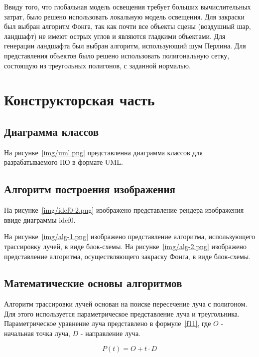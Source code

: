 Ввиду того, что глобальная модель освещения требует больших вычислительных затрат, было решено использовать локальную модель освещения. Для закраски был выбран алгоритм Фонга, так как почти все объекты сцены (воздушный шар, ландшафт) не имеют острых углов и являются гладкими объектами. Для генерации ландшафта был выбран алгоритм, использующий шум Перлина. Для представления объектов было решено использовать полигональную сетку, состоящую из треугольных полигонов, с заданной нормалью.

\chapter{Конструкторская часть}
\section{Диаграмма классов}
На рисунке~\ref{img/uml.png} представленна диаграмма классов для разрабатываемого ПО в формате UML.

\section{Алгоритм построения изображения}
На рисунке~\ref{img/idef0-2.png} изображено представление рендера изображения ввиде диаграммы idef0.

На рисунке~\ref{img/alg-1.png} изображено представление алгоритма, использующего трассировку лучей, в виде блок-схемы. На рисунке~\ref{img/alg-2.png} изображено представление алгоритма, осуществляющего закраску Фонга, в виде блок-схемы.



\section{Математические основы алгоритмов}
Алгоритм трассировки лучей основан на поиске пересечение луча с полигоном. Для этого используется параметрическое представление луча и треугольника.
Параметрическое уравнение луча представлено в формуле~\ref{f11}, где $O$ - начальная точка луча, $D$ - направление луча.

\begin{equation}
P(t) = O + t \cdot D
\label{f11}
\end{equation}

